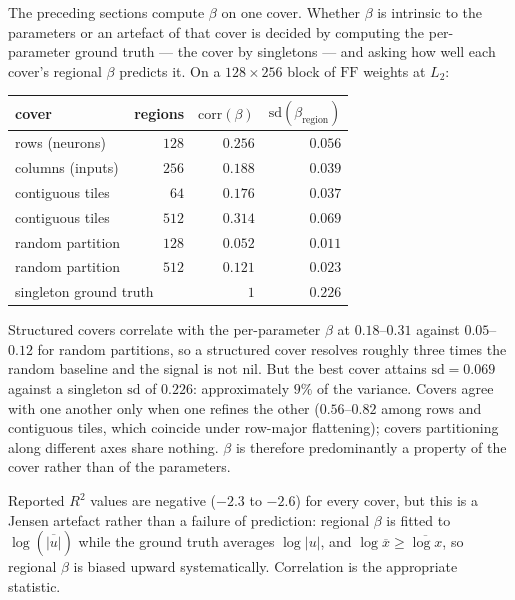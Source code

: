 The preceding sections compute $\beta$ on one cover. Whether $\beta$ is
intrinsic to the parameters or an artefact of that cover is decided by
computing the per-parameter ground truth --- the cover by singletons --- and
asking how well each cover's regional $\beta$ predicts it. On a
$128\times256$ block of $\mathrm{FF}$ weights at $L_2$:

\begin{center}
\begin{tabular}{lrrr}
\toprule
cover & regions & $\mathrm{corr}(\beta)$ & $\mathrm{sd}(\beta_{\text{region}})$ \\
\midrule
rows (neurons)      & $128$ & $0.256$ & $0.056$ \\
columns (inputs)    & $256$ & $0.188$ & $0.039$ \\
contiguous tiles    & $64$  & $0.176$ & $0.037$ \\
contiguous tiles    & $512$ & $0.314$ & $0.069$ \\
random partition    & $128$ & $0.052$ & $0.011$ \\
random partition    & $512$ & $0.121$ & $0.023$ \\
\midrule
\multicolumn{2}{l}{singleton ground truth} & $1$ & $0.226$ \\
\bottomrule
\end{tabular}
\end{center}

\begin{proposition}
Structured covers correlate with the per-parameter $\beta$ at $0.18$--$0.31$
against $0.05$--$0.12$ for random partitions, so a structured cover resolves
roughly three times the random baseline and the signal is not nil. But the
best cover attains $\mathrm{sd} = 0.069$ against a singleton $\mathrm{sd}$ of
$0.226$: approximately $9\%$ of the variance. Covers agree with one another
only when one refines the other ($0.56$--$0.82$ among rows and contiguous
tiles, which coincide under row-major flattening); covers partitioning along
different axes share nothing. $\beta$ is therefore predominantly a property of
the cover rather than of the parameters.
\end{proposition}

Reported $R^2$ values are negative ($-2.3$ to $-2.6$) for every cover, but this
is a Jensen artefact rather than a failure of prediction: regional $\beta$ is
fitted to $\log(\overline{|u|})$ while the ground truth averages $\log|u|$, and
$\log \overline{x} \geq \overline{\log x}$, so regional $\beta$ is biased
upward systematically. Correlation is the appropriate statistic.

